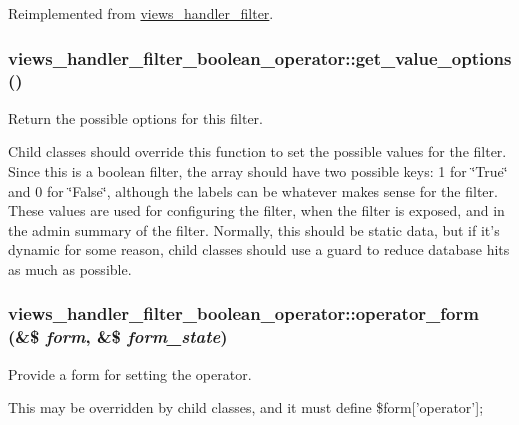 Reimplemented from \hyperlink{classviews__handler__filter_07ab6afc47bf892fb5fd5934c3f1d64c}{views\_\-handler\_\-filter}.\hypertarget{classviews__handler__filter__boolean__operator_d2c5508cee59025448c3c18a862976d8}{
\subsubsection[{get\_\-value\_\-options}]{\setlength{\rightskip}{0pt plus 5cm}views\_\-handler\_\-filter\_\-boolean\_\-operator::get\_\-value\_\-options ()}}
\label{classviews__handler__filter__boolean__operator_d2c5508cee59025448c3c18a862976d8}


Return the possible options for this filter.

Child classes should override this function to set the possible values for the filter. Since this is a boolean filter, the array should have two possible keys: 1 for \char`\"{}True\char`\"{} and 0 for \char`\"{}False\char`\"{}, although the labels can be whatever makes sense for the filter. These values are used for configuring the filter, when the filter is exposed, and in the admin summary of the filter. Normally, this should be static data, but if it's dynamic for some reason, child classes should use a guard to reduce database hits as much as possible. \hypertarget{classviews__handler__filter__boolean__operator_2b8c0523843b8f24144bf5a59254cdd9}{
\subsubsection[{operator\_\-form}]{\setlength{\rightskip}{0pt plus 5cm}views\_\-handler\_\-filter\_\-boolean\_\-operator::operator\_\-form (\&\$ {\em form}, \/  \&\$ {\em form\_\-state})}}
\label{classviews__handler__filter__boolean__operator_2b8c0523843b8f24144bf5a59254cdd9}


Provide a form for setting the operator.

This may be overridden by child classes, and it must define \$form\mbox{[}'operator'\mbox{]}; 

